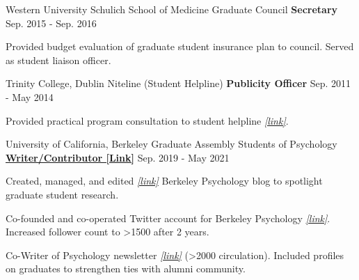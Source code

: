 \begin{cventries}
  \cventry
  	{Western University} %
  	{Schulich School of Medicine Graduate Council} %
    {\textbf{Secretary}} %
    {Sep. 2015 - Sep. 2016} %
    {
      \begin{cvitems} %
        \item {Provided budget evaluation of graduate student insurance plan to council. Served as student liaison officer.}
      \end{cvitems}
    }
    
  \cventry
  	{Trinity College, Dublin}
  	{Niteline (Student Helpline)} %
    {\textbf{Publicity Officer}} %
    {Sep. 2011 - May 2014} %
    {
      \begin{cvitems} %
        \item {Provided practical program consultation to student helpline \href{https://niteline.ie/}{\textit{[link]}}.}
      \end{cvitems}
    }


  \cventry 
    {University of California, Berkeley} %
    {Graduate Assembly Students of Psychology}
    {\href{https://psychblog.berkeley.edu/opinion/2019/09/09/Graduate-School-Advice/}{\textbf{Writer/Contributor [Link]}}} %
    {Sep. 2019 - May 2021} %
    {
      \begin{cvitems} 
      	\item {Created, managed, and edited \href{https://psychblog.berkeley.edu/blog/}{\textit{[link]}} Berkeley Psychology blog to spotlight graduate student research.}
      	\item {Co-founded and co-operated Twitter account for Berkeley Psychology \href{https://twitter.com/BerkeleyPsych}{\textit{[link]}}. Increased follower count to >1500 after 2 years.}
      	\item {Co-Writer of Psychology newsletter \href{https://psychology.berkeley.edu/sites/default/files/newsletters/2021spr_fullnewsletter_v2.pdf}{\textit{[link]}} (>2000 circulation). Included profiles on graduates to strengthen ties with alumni community.}
      \end{cvitems}
    }
    
\begin{cventries}


\end{cventries}
\end{cventries}

